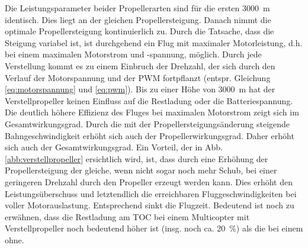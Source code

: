 Die Leistungsparameter beider Propellerarten sind für die ersten \SI{3000}{m} identisch. Dies liegt an der gleichen Propellersteigung. Danach nimmt die optimale Propellersteigung kontinuierlich zu. Durch die Tatsache, dass die Steigung variabel ist, ist durchgehend ein Flug mit maximaler Motorleistung, d.h. bei einem maximalen Motorstrom und -spannung, möglich. Durch jede Verstellung kommt es zu einem Einbruch der Drehzahl, der sich durch den Verlauf der Motorspannung und der PWM fortpflanzt (entspr. Gleichung \ref{eq:motorspannung} und \ref{eq:pwm}). Bis zu einer Höhe von \SI{3000}{m} hat der Verstellpropeller keinen Einfluss auf die Restladung oder die Batteriespannung. Die deutlich höhere Effizienz des Fluges bei maximalen Motorstrom zeigt sich im Gesamtwirkungsgrad. Durch die mit der Propellersteigungsänderung steigende Bahngeschwindigkeit erhöht sich auch der Propellerwirkungsgrad. Daher erhöht sich auch der Gesamtwirkungsgrad. 
Ein Vorteil, der in Abb. \ref{abb:verstellpropeller} ersichtlich wird, ist, dass durch eine Erhöhung der Propellersteigung der gleiche, wenn nicht sogar noch mehr Schub, bei einer geringeren Drehzahl durch den Propeller erzeugt werden kann. Dies erhöht den Leistungsüberschuss und letztendlich die erreichbaren Fluggeschwindigkeiten bei voller Motorauslastung. Entsprechend sinkt die Flugzeit.
Bedeutend ist noch zu erwähnen, dass die Restladung am TOC bei einem Multicopter mit Verstellpropeller noch bedeutend höher ist (insg. noch ca. \SI{20}{\%}) als die bei einem ohne.


